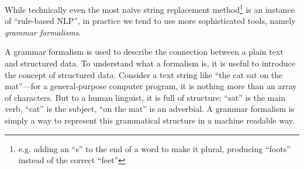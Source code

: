 
While technically even the most naive string replacement method\footnote{e.g. adding an ``s'' to the end of a word to make it plural, producing ``foots'' instead of the correct ``feet''} is an instance of ``rule-based \ac{NLP}'', in practice we tend to use more sophisticated tools, namely \emph{grammar formalisms}.

% 
% 
% 
% 
% 

A grammar formalism is used to describe the connection between a plain text and structured data. To understand what a formalism is, it is useful to introduce the concept of structured data. Consider a text string like ``the cat sat on the mat''—for a general-purpose computer program, it is nothing more than an array of characters. But to a human linguist, it is full of structure: ``sat'' is the main verb, ``cat'' is the subject, “on the mat” is an adverbial. A grammar formalism is simply a way to represent this grammatical structure in a machine readable way.



